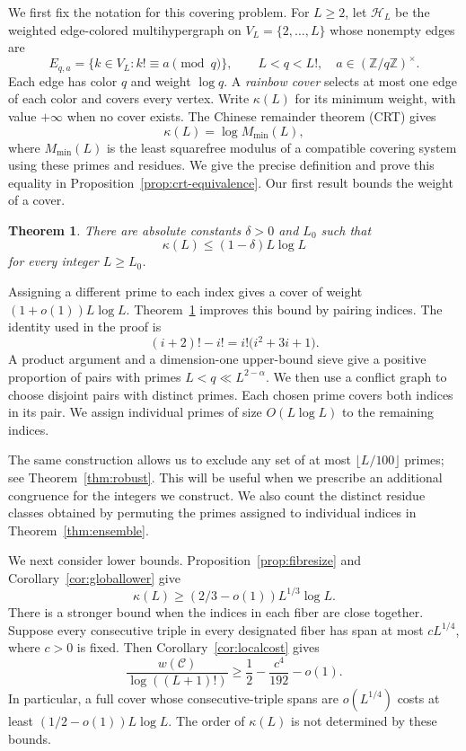 \documentclass[11pt]{amsart}
\newtheorem{theorem}{Theorem}[section]
\theoremstyle{definition}
\theoremstyle{remark}
\begin{document}
We first fix the notation for this covering problem. For $L\geq2$, let
$\mathcal H_L$ be the weighted edge-colored
multihypergraph on $V_L=\{2,\ldots,L\}$ whose nonempty edges are
\[
E_{q,a}=\{k\in V_L:k!\equiv a\pmod q\},
\qquad L<q<L!,\quad a\in(\mathbb Z/q\mathbb Z)^\times.
\]
Each edge has color $q$ and weight $\log q$. A \emph{rainbow cover} selects
at most one edge of each color and covers every vertex. Write $\kappa(L)$
for its minimum weight, with value $+\infty$ when no cover exists.
The Chinese remainder theorem (CRT) gives
\[
\kappa(L)=\log M_{\min}(L),
\]
where $M_{\min}(L)$ is the least squarefree modulus of a compatible
covering system using these primes and residues. We give the precise
definition and prove this equality in
Proposition~\ref{prop:crt-equivalence}. Our first result bounds the
weight of a cover.
\begin{theorem}\label{thm:covercost}
There are absolute constants $\delta>0$ and $L_0$ such that
\[
\kappa(L)\leq(1-\delta)L\log L
\]
for every integer $L\geq L_0$.
\end{theorem}
Assigning a different prime to each index gives a cover of weight
$(1+o(1))L\log L$. Theorem~\ref{thm:covercost} improves this bound by
pairing indices. The identity used in the proof is
\begin{equation}\label{eq:keyidentity}
(i+2)!-i!=i!\bigl(i^2+3i+1\bigr).
\end{equation}
A product argument and a dimension-one upper-bound sieve give a
positive proportion of pairs with primes $L<q\ll L^{2-\alpha}$.
We then use a conflict graph to choose disjoint pairs with distinct
primes. Each chosen prime covers both indices in its pair. We assign
individual primes of size $O(L\log L)$ to the remaining indices.

The same construction allows us to exclude any set of at most
$\lfloor L/100\rfloor$ primes; see Theorem~\ref{thm:robust}.
This will be useful when we prescribe an additional congruence for the
integers we construct. We also count the distinct residue classes
obtained by permuting the primes assigned to individual indices in
Theorem~\ref{thm:ensemble}.

We next consider lower bounds. Proposition~\ref{prop:fibresize} and
Corollary~\ref{cor:globallower} give
\[
\kappa(L)\geq(2/3-o(1))L^{1/3}\log L.
\]
There is a stronger bound when the indices in each fiber are close
together. Suppose every consecutive triple in every designated fiber
has span at most $cL^{1/4}$, where $c>0$ is fixed. Then
Corollary~\ref{cor:localcost} gives
\[
\frac{w(\mathcal C)}{\log((L+1)!)}
\geq\frac12-\frac{c^4}{192}-o(1).
\]
In particular, a full cover whose consecutive-triple spans are
$o(L^{1/4})$ costs at least $(1/2-o(1))L\log L$.
The order of $\kappa(L)$ is not determined by these bounds.
\end{document}

